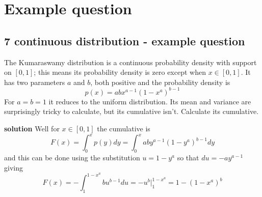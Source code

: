 
\ifind
\section*{Example question}
\else
\subsection*{7 continuous distribution - example question}
\fi
The Kumaraswamy distribution is a continuous probability density with
support on $[0,1]$; this means its probability density is zero except
when $x\in [0,1]$. It has two parameters $a$ and $b$, both positive
and the probability density is
\begin{equation}
p(x)=abx^{a-1}(1-x^a)^{b-1}
\end{equation}
For $a=b=1$ it reduces to the uniform distribution. Its mean and
variance are surprisingly tricky to calculate, but its cumulative isn't. Calculate its cumulative.

\noindent \textbf{solution} Well for $x\in[0,1]$ the cumulative is
\begin{equation}
F(x)=\int_0^x p(y)dy=\int_0^x aby^{a-1}(1-y^a)^{b-1}dy 
\end{equation}
and this can be done using the substitution $u=1-y^a$ so that $du=-ay^{a-1}$ giving
\begin{equation}
F(x)=-\int_1^{1-x^a} bu^{b-1}du=-u^b|_1^{1-x^a}=1-(1-x^a)^b 
\end{equation}
